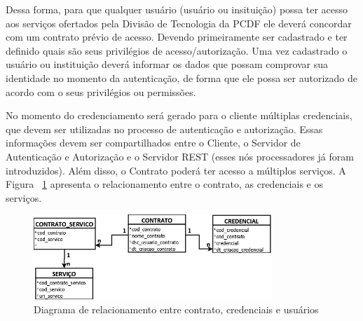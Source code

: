 Dessa forma, para que qualquer usu\'{a}rio {\color{red}(usuário ou insitui\c c\~{a}o)} possa ter acesso aos serviços ofertados pela Divisão de Tecnologia da PCDF ele deverá concordar com um contrato prévio de acesso. Devendo primeiramente ser cadastrado e ter definido quais são seus privilégios de acesso/autorização. Uma vez cadastrado o {\color{red}usuário ou institui\c c\~{a}o} deverá informar os dados que possam comprovar sua identidade no momento da autenticação, de forma que ele possa ser autorizado de acordo com o seus {\color{red}privilégios ou permiss\~{o}es}.

No momento do credenciamento será gerado para o cliente múltiplas credenciais, que devem ser utilizadas no processo de autenticação e autorização. Essas informações 
devem ser compartilhados entre o Cliente, o Servidor de Autenticação e Autorização e o Servidor REST ({\color{red}esses n\'{o}s processadores j\'{a} foram introduzidos}). Além disso, o Contrato poderá ter acesso a múltiplos serviços. A Figura ~\ref{fig:diagrama_relacionamento} apresenta o relacionamento entre o contrato, as credenciais e os serviços.

\begin{figure}[!htb]
    \centering
    \includegraphics[width=0.8\textwidth]{modelo_relacionamento_contrato1.png}
    \caption{Diagrama de relacionamento entre contrato, credenciais e usuários}
    \label{fig:diagrama_relacionamento}
\end{figure}




